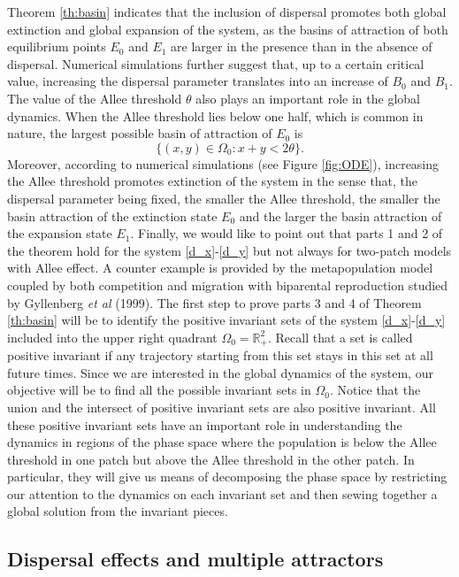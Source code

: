  Theorem \ref{th:basin} indicates that the inclusion of dispersal promotes both global extinction and global expansion of the
 system, as the basins of attraction of both equilibrium points $E_0$ and $E_1$ are larger in the presence than in the absence
 of dispersal.
 Numerical simulations further suggest that, up to a certain critical value, increasing the dispersal parameter translates
 into an increase of $B_0$ and $B_1$.
 The value of the Allee threshold $\theta$ also plays an important role in the global dynamics.
 When the Allee threshold lies below one half, which is common in nature, the largest possible basin of attraction of $E_0$ is
 $$ \{(x, y) \in \Omega_0 : x + y < 2 \theta \}. $$
 Moreover, according to numerical simulations (see Figure \ref{fig:ODE}), increasing the Allee threshold promotes extinction of
 the system in the sense that, the dispersal parameter being fixed, the smaller the Allee threshold, the smaller the basin
 attraction of the extinction state $E_0$ and the larger the basin attraction of the expansion state $E_1$.  
 Finally, we would like to point out that parts 1 and 2 of the theorem hold for the system \eqref{d_x}-\eqref{d_y} but not
 always for two-patch models with Allee effect.
 A counter example is provided by the metapopulation model coupled by both competition and migration with biparental reproduction
 studied by Gyllenberg \emph{et al} (1999).
 The first step to prove parts 3 and 4 of Theorem \ref{th:basin} will be to identify the positive invariant sets of the
 system \eqref{d_x}-\eqref{d_y} included into the upper right quadrant $\Omega_0 = {{\mathbb{R}}}_+^2$.
 Recall that a set is called positive invariant if any trajectory starting from this set stays in this set at all future times.
 Since we are interested in the global dynamics of the system, our objective will be to find all the possible invariant sets
 in $\Omega_0$.
 Notice that the union and the intersect of positive invariant sets are also positive invariant.
 All these positive invariant sets have an important role in understanding the dynamics in regions of the phase space where the
 population is below the Allee threshold in one patch but above the Allee threshold in the other patch.
 In particular, they will give us means of decomposing the phase space by restricting our attention to the dynamics on each
 invariant set and then sewing together a global solution from the invariant pieces.

\subsection{ Dispersal effects and multiple attractors}

